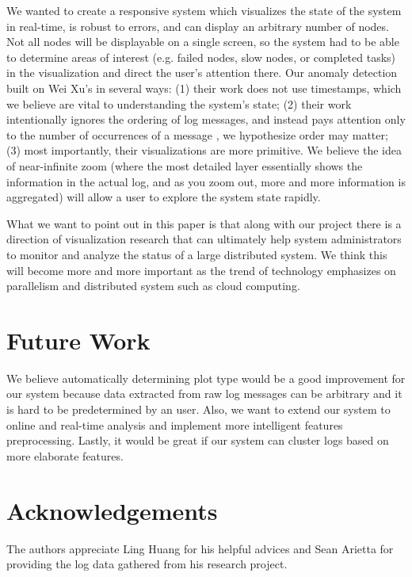 \documentclass[conference]{style/acmsiggraph}
\begin{document}
We wanted to create a responsive system which visualizes the state of the system in real-time, is
robust to errors, and can display an arbitrary number of nodes. Not all nodes will be displayable on
a single screen, so the system had to be able to determine areas of interest (e.g. failed nodes,
slow nodes, or completed tasks) in the visualization and direct the user’s attention there. Our
anomaly detection built on Wei Xu's in several ways: (1) their work does not use timestamps, which
we believe are vital to understanding the system’s state; (2) their work intentionally ignores the
ordering of log messages, and instead pays attention only to the number of occurrences of a message
, we hypothesize order may matter; (3) most importantly, their visualizations are more primitive. We
believe the idea of near-infinite zoom (where the most detailed layer essentially shows the
information in the actual log, and as you zoom out, more and more information is aggregated) will
allow a user to explore the system state rapidly.

What we want to point out in this paper is that along with our project there is a direction of
visualization research that can ultimately help system administrators to monitor and analyze the
status of a large distributed system. We think this will become more and more important as the trend
of technology emphasizes on parallelism and distributed system such as cloud computing.


\section{Future Work}

We believe automatically determining plot type would be a good improvement for our system because
data extracted from raw log messages can be arbitrary and it is hard to be predetermined by an user.
Also, we want to extend our system to online and real-time analysis and implement more intelligent
features preprocessing. Lastly, it would be great if our system can cluster logs based on more
elaborate features.

\section*{Acknowledgements}
The authors appreciate Ling Huang for his helpful advices and Sean Arietta for providing the log
data gathered from his research project.




\end{document}
